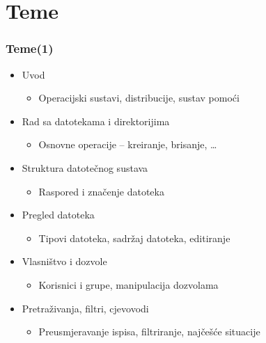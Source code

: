 \documentclass{beamer}
\begin{document}
\section{Teme}
\begin{frame}[t]
\frametitle{Teme(1)}
\begin{itemize}
	\item Uvod
	\begin{itemize}
		\item Operacijski sustavi, distribucije, sustav pomoći
	\end{itemize}
	\item Rad sa datotekama i direktorijima
	\begin{itemize}
		\item Osnovne operacije – kreiranje, brisanje, \ldots
	\end{itemize}
	\item Struktura datotečnog sustava
	\begin{itemize}
		\item Raspored i značenje datoteka
	\end{itemize}
	\item Pregled datoteka
	\begin{itemize}
		\item Tipovi datoteka, sadržaj datoteka, editiranje
	\end{itemize}
	\item Vlasništvo i dozvole
	\begin{itemize}
		\item Korisnici i grupe, manipulacija dozvolama
	\end{itemize}
	\item Pretraživanja, filtri, cjevovodi
	\begin{itemize}
		\item Preusmjeravanje ispisa, filtriranje, najčešće situacije
	\end{itemize}
\end{itemize}
\end{frame}
\end{document}
